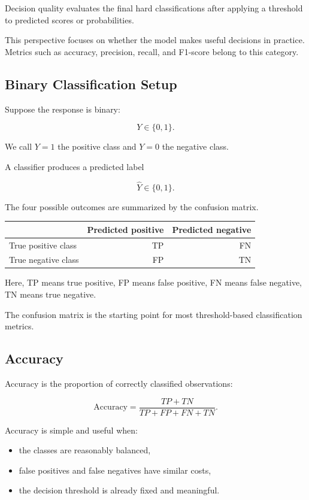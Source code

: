 \documentclass[
  letterpaper,
  DIV=11,
  numbers=noendperiod]{scrreprt}
\newcounter{none} %
\providecommand{\tightlist}{%
  \setlength{\itemsep}{0pt}\setlength{\parskip}{0pt}}
\theoremstyle{definition}
\theoremstyle{definition}
\theoremstyle{plain}
\theoremstyle{plain}
\theoremstyle{remark}
\begin{document}
Decision quality evaluates the final hard classifications after applying
a threshold to predicted scores or probabilities.

This perspective focuses on whether the model makes useful decisions in
practice. Metrics such as accuracy, precision, recall, and F1-score
belong to this category.

\subsection{Binary Classification
Setup}\label{binary-classification-setup}

Suppose the response is binary:

\[
Y\in\{0,1\}.
\]

We call \(Y=1\) the positive class and \(Y=0\) the negative class.

A classifier produces a predicted label

\[
\hat Y\in\{0,1\}.
\]

The four possible outcomes are summarized by the confusion matrix.

{\def\LTcaptype{none} %
\begin{longtable}[]{@{}lrr@{}}
\toprule\noalign{}
& Predicted positive & Predicted negative \\
\midrule\noalign{}
\endhead
\bottomrule\noalign{}
\endlastfoot
True positive class & TP & FN \\
True negative class & FP & TN \\
\end{longtable}
}

Here, TP means true positive, FP means false positive, FN means false
negative, TN means true negative.

The confusion matrix is the starting point for most threshold-based
classification metrics.

\subsection{Accuracy}\label{accuracy}

Accuracy is the proportion of correctly classified observations:

\[
\text{Accuracy}
=
\frac{TP+TN}{TP+FP+FN+TN}.
\]

Accuracy is simple and useful when:

\begin{itemize}
\tightlist
\item
  the classes are reasonably balanced,
\item
  false positives and false negatives have similar costs,
\item
  the decision threshold is already fixed and meaningful.
\end{itemize}
\end{document}

